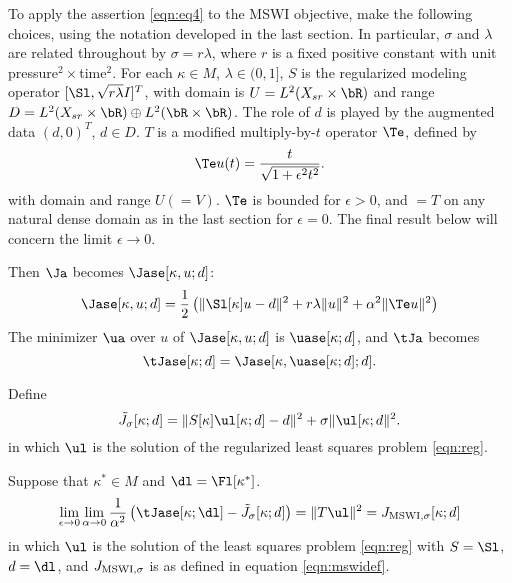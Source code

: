 To apply the assertion \ref{eqn:eq4} to the MSWI objective, make the
following choices, using the notation developed in the last section.
In particular, $\sigma$ and $\lambda$ are related throughout by
$\sigma=r\lambda$, where $r$ is a fixed positive constant with unit
pressure$^2 \times$time$^2$.
For each $\kappa \in M$, $\lambda \in (0,1]$, $S$ is the regularized
modeling operator $[\Sl,\sqrt{r\lambda} I]^T$, with domain is
$U=L^2(X_{sr}\times\bR)$ and range $D =  L^2(X_{sr} \times \bR) \oplus
L^2(\bR \times \bR)$. The role of $d$ is played by the
augmented data $(d,0)^T$, $d \in D$. $T$ is a modified multiply-by-$t$ operator
$\Te$, defined by 
\begin{equation}
  \label{eqn:teps}
  \Te u(t) = \frac{t}{\sqrt{1+\epsilon^2t^2}}.
\end{equation}
with domain and range $U ( = V)$. $\Te$ is bounded for $\epsilon>0$,
and $=T$ on any natural dense domain as in the last section for $\epsilon=0$. The final result below will
concern the limit $\epsilon \rightarrow 0$.

Then $\Ja$ becomes $\Jase[\kappa,u;d]$:
\begin{equation}
  \label{eqn:mswipen}
   \Jase[\kappa,u;d] = \frac{1}{2}\left(\|\Sl[\kappa]u-d\|^2 +
   r\lambda\|u\|^2 + \alpha^2\|\Te u\|^2\right)
 \end{equation}
The minimizer $\ua$ over $u$ of $\Jase[\kappa,u;d]$ is
$\uase[\kappa;d]$, and $\tJa$ becomes
\begin{equation}
  \label{eqn:mswipenred}
  \tJase[\kappa;d] =
  \Jase[\kappa,\uase[\kappa;d];d].
\end{equation}

Define
\begin{equation}
  \label{eqn:tj0def}
  \tilde{J}_{\sigma}[\kappa;d] = \|S[\kappa]\ul[\kappa;d] - d\|^2 + \sigma\|\ul[\kappa;d\|^2.
\end{equation}
in which $\ul$ is the solution of the regularized least squares
problem \ref{eqn:reg}. 

\begin{prop}
  \label{thm:MSWIepsalphalim}
Suppose that $\kappa^* \in M$ and $\dl=\Fl[\kappa^*]$.
\begin{equation}
  \label{eqn:eq7}
  \lim_{\epsilon \rightarrow 0}\lim_{\alpha \rightarrow 0}
  \frac{1}{\alpha^2}\left(\tJase[\kappa;\dl]-\tilde{J}_{\sigma}[\kappa;d]\right)=
 \|T\ul\|^2 =  J_{\rm MSWI,\sigma}[\kappa;d]
\end{equation}
in which $\ul$ is the solution of the least squares problem
\ref{eqn:reg} with $S=\Sl$, $d=\dl$, and $J_{\rm MSWI,\sigma}$ is as
defined in equation \ref{eqn:mswidef}.
\end{prop}

